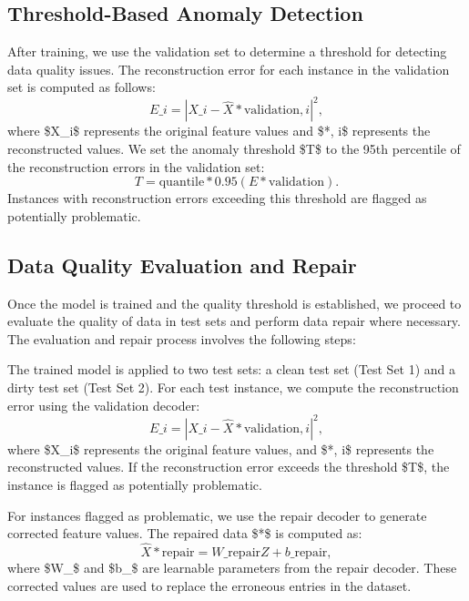 \subsection{Threshold-Based Anomaly Detection}

After training, we use the validation set to determine a threshold for detecting data quality issues. The reconstruction error for each instance in the validation set is computed as follows:
\begin{equation}
E\_i = | X\_i - \hat{X}*{\text{validation}, i} |^2,
\end{equation}
where \$X\_i\$ represents the original feature values and \$*{, i}\$ represents the reconstructed values. We set the anomaly threshold \$T\$ to the 95th percentile of the reconstruction errors in the validation set:
\begin{equation}
T = \text{quantile}*{0.95}(E*{\text{validation}}).
\end{equation}
Instances with reconstruction errors exceeding this threshold are flagged as potentially problematic.

\subsection{Data Quality Evaluation and Repair}

Once the model is trained and the quality threshold is established, we proceed to evaluate the quality of data in test sets and perform data repair where necessary. The evaluation and repair process involves the following steps:

The trained model is applied to two test sets: a clean test set (Test Set 1) and a dirty test set (Test Set 2). For each test instance, we compute the reconstruction error using the validation decoder:
\begin{equation}
E\_i = | X\_i - \hat{X}*{\text{validation}, i} |^2,
\end{equation}
where \$X\_i\$ represents the original feature values, and \$*{, i}\$ represents the reconstructed values. If the reconstruction error exceeds the threshold \$T\$, the instance is flagged as potentially problematic.

For instances flagged as problematic, we use the repair decoder to generate corrected feature values. The repaired data \$*{}\$ is computed as:
\begin{equation}
\hat{X}*{\text{repair}} = W\_{\text{repair}} Z + b\_{\text{repair}},
\end{equation}
where \$W\_{}\$ and \$b\_{}\$ are learnable parameters from the repair decoder. These corrected values are used to replace the erroneous entries in the dataset.

